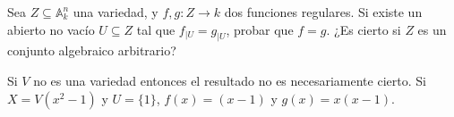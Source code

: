 \documentclass[twoside]{article}
\begin{document}
\begin{ejercicio}{30}
 Sea $Z\subseteq\mathbb{A}^n_k$ una variedad, y $f,g:Z\to k$ dos funciones regulares. Si existe un abierto no vacío $U\subseteq Z$ tal que $f_{|U}=g_{|U}$, probar que $f=g$. ¿Es cierto si $Z$ es un conjunto algebraico arbitrario?
\end{ejercicio}
\begin{sol}
Si $V$ no es una variedad entonces el resultado no es necesariamente cierto. Si $X=V(x^2-1)$ y $U=\{1\}$, $f(x)=(x-1)$ y $g(x)=x(x-1)$. 
\end{sol}
\end{document}
